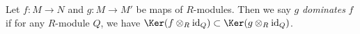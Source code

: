 \begin{definition}
\label{definition-domination}
Let $f: M \to N$ and $g: M \to M'$ be maps of $R$-modules.
Then we say $g$ {\it dominates} $f$ if for any $R$-module $Q$, we have $\Ker(f
\otimes_R \text{id}_Q) \subset \Ker(g \otimes_R \text{id}_Q)$.
\end{definition}